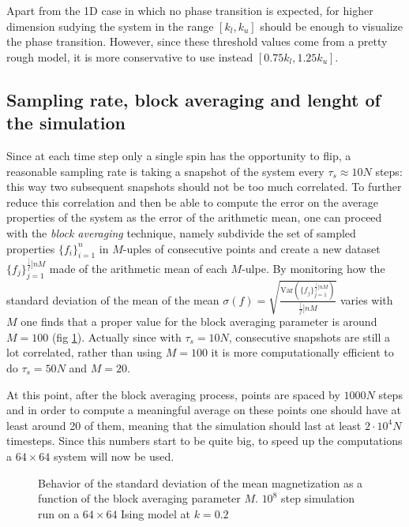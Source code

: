 \documentclass[a4paper, 11pt]{article}
\begin{document}
      Apart from the 1D case in which no phase transition is expected, for higher dimension sudying the system in the range $[k_l,k_u]$ should be enough to visualize the phase transition. However, since these threshold values come from a pretty rough model, it is more conservative to use instead $[0.75k_l,1.25k_u]$.


    \subsection{Sampling rate, block averaging and lenght of the simulation}
      Since at each time step only a single spin has the opportunity to flip, a reasonable sampling rate is taking a snapshot of the system every $\tau_s \approx 10N$ steps: this way two subsequent snapshots should not be too much correlated. To further reduce this correlation and then be able to compute the error on the average properties of the system as the error of the arithmetic mean, one can proceed with the \emph{block averaging} technique, namely subdivide the set of sampled properties $\{f_i\}_{i=1}^n$ in $M$-uples of consecutive points and create a new dataset $\{f_j\}_{j=1}^{\frac[f]{n}{M}}$ made of the arithmetic mean of each $M$-ulpe.
      By monitoring how the standard deviation of the mean of the mean $\sigma(f) = \sqrt{\frac{\text{Var}\left( \{f_j\}_{j=1}^{\frac[f]{n}{M}} \right)}{\frac[f]{n}{M}}}$ varies with $M$ one finds that a proper value for the block averaging parameter is around $M = 100$ (fig \ref{fig:block_averaging}).
      Actually since with $\tau_s = 10N$, consecutive snapshots are still a lot correlated, rather than using $M = 100$ it is more computationally efficient to do $\tau_s = 50N$ and $M = 20$.


      At this point, after the block averaging process, points are spaced by $1000 N$ steps and in order to compute a meaningful average on these points one should have at least around 20 of them, meaning that the simulation should last at least $2\cdot10^4 N$ timesteps.
      Since this numbers start to be quite big, to speed up the computations a $64\times64$ system will now be used.

      \begin{figure}[H]
        \centering
        \caption{Behavior of the standard deviation of the mean magnetization as a function of the block averaging parameter $M$. $10^8$ step simulation run on a $64\times64$ Ising model at $k = 0.2$}
        \label{fig:block_averaging}
      \end{figure}
\end{document}
